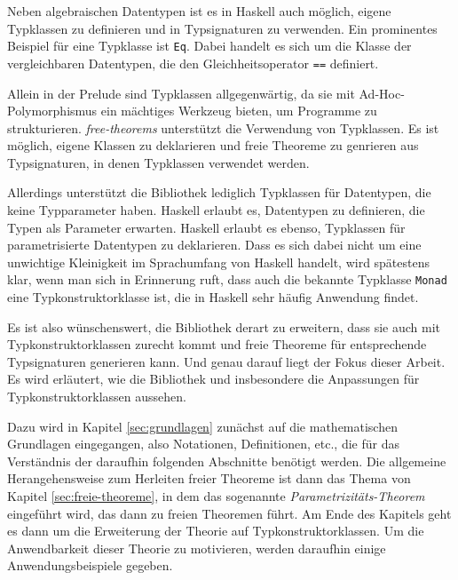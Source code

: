 Neben algebraischen Datentypen ist es in Haskell auch möglich, eigene Typklassen zu definieren und in
Typsignaturen zu verwenden. Ein prominentes Beispiel für eine Typklasse ist \texttt{Eq}. Dabei handelt es sich um
die Klasse der vergleichbaren Datentypen, die den Gleichheitsoperator \texttt{==} definiert.

Allein in der Prelude sind Typklassen allgegenwärtig, da sie mit Ad-Hoc-Poly\-mor\-phis\-mus ein mächtiges Werkzeug bieten,
um Programme zu strukturieren. \textit{free-theorems} unterstützt die Verwendung von Typklassen. Es ist möglich, eigene
Klassen zu deklarieren und freie Theoreme zu genrieren aus Typsignaturen, in denen Typklassen verwendet werden.

Allerdings unterstützt die Bibliothek lediglich Typklassen für Datentypen, die keine Typparameter haben. Haskell erlaubt es,
Datentypen zu definieren, die Typen als Parameter erwarten. Haskell erlaubt es ebenso, Typklassen für parametrisierte
Datentypen zu deklarieren. Dass es sich dabei nicht um eine unwichtige Kleinigkeit im Sprachumfang von Haskell handelt, wird spätestens klar, wenn man
sich in Erinnerung ruft, dass auch die bekannte Typklasse \texttt{Monad} eine Typkonstruktorklasse ist, die in Haskell sehr häufig
Anwendung findet.

Es ist also wünschenswert, die Bibliothek derart zu erweitern, dass sie auch mit Typkonstruktorklassen zurecht kommt und
freie Theoreme für entsprechende Typsignaturen generieren kann. Und genau darauf liegt der Fokus dieser Arbeit. Es wird
erläutert, wie die Bibliothek und insbesondere die Anpassungen für Typkonstruktorklassen aussehen.

Dazu wird in Kapitel \ref{sec:grundlagen} zunächst auf die mathematischen Grundlagen eingegangen, also Notationen, Definitionen,
etc., die für das Verständnis der daraufhin folgenden Abschnitte benötigt werden.
Die allgemeine Herangehensweise zum Herleiten freier Theoreme ist dann das Thema von Kapitel \ref{sec:freie-theoreme}, in dem
das sogenannte \textit{Parametrizitäts-Theorem} eingeführt wird, das dann zu freien Theoremen führt.
Am Ende des Kapitels geht es dann um die Erweiterung der Theorie auf Typkonstruktorklassen. Um die Anwendbarkeit dieser
Theorie zu motivieren, werden daraufhin einige Anwendungsbeispiele gegeben.


